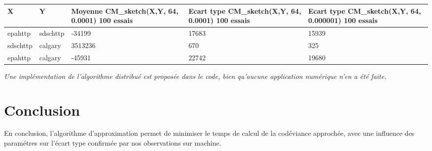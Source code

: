\documentclass[a4paper,11pt]{article}%
\newenvironment{remarque}%
{\description\item[Remarque.]\sl}%
{\enddescription}
\begin{document}
\begin{tabularx}{\textwidth}{|l|l|X|X|X|}
      \hline X & Y & Moyenne CM\_sketch(X,Y, 64, 0.0001) 100 essais & Ecart type CM\_sketch(X,Y, 64, 0.0001) 100 essais & Ecart type CM\_sketch(X,Y, 64, 0.000001) 100 essais\\ \hline
      epahttp & sdschttp & -34199 & 17683 & 15939\\ \hline
      sdschttp & calgary & 3513236 & 670 & 325\\ \hline
      epahttp & calgary & -45931  & 22742 & 19680\\ \hline
\end{tabularx}

\begin{remarque}
 Une implémentation de l'algorithme distribué est proposée dans le code, bien qu'aucune application numérique n'en a été faite. 

\end{remarque}

\section{Conclusion}

En conclusion, l'algorithme d'approximation permet de minimiser le temps de calcul de la codéviance approchée, avec une influence des paramétres sur l'écart type confirmée par nos observations sur machine.
\end{document}
